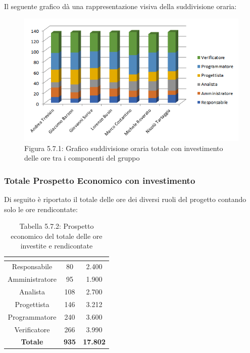 Il seguente grafico dà una rappresentazione visiva della suddivisione oraria: \\
\begin{figure} [H]
	\centering
	\includegraphics[scale=1]{Res/ExcelGrafici/Grafici/InvestimentoOre.png}
	\caption{Figura 5.7.1: Grafico suddivisione oraria totale con investimento delle ore tra i componenti del gruppo}\label{}
\end{figure}

\subsubsection{Totale Prospetto Economico con investimento}
Di seguito è riportato il totale delle ore dei diversi ruoli del progetto contando solo le ore rendicontate:

\renewcommand{\arraystretch}{1.5}
\begin{table}[H]
\begin{center}
\begin{tabular}{|c|c|c|}
\hline
\rowcolor{title_row}
\textbf{\color{title_text}{Ruolo}}  & \textbf{\color{title_text}{Ore}} & \textbf{\color{title_text}{Costo in \euro}} \\ \hline
Responsabile    & 80 & 2.400 \\ \hline
Amministratore  & 95 & 1.900 \\ \hline
Analista        & 108 & 2.700 \\ \hline
Progettista     & 146 & 3.212 \\ \hline
Programmatore   & 240 & 3.600 \\ \hline
Verificatore    & 266 & 3.990 \\ \hline
\textbf{Totale} & \textbf{935}    & \textbf{17.802}           \\ \hline
\end{tabular}
\caption{Tabella 5.7.2: Prospetto economico del totale delle ore investite e rendicontate \label{}}
\end{center}
\end{table}
\renewcommand{\arraystretch}{1}

